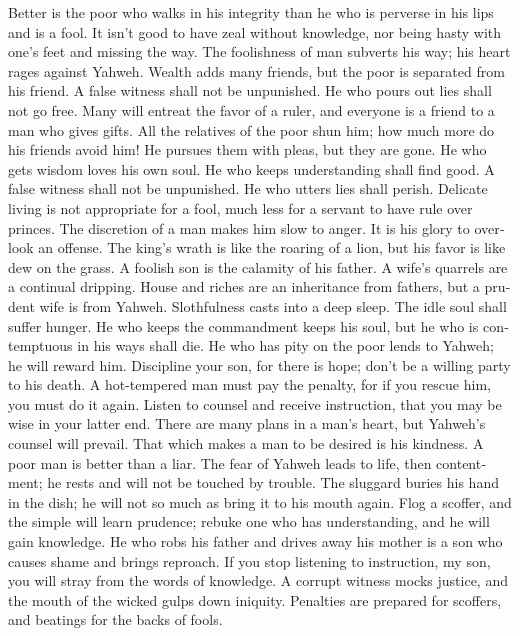 \begin{paracol}{2}
\begin{otherlanguage}{english}
 Better is the poor who walks in his integrity than he who
is perverse in his lips and is a fool.  It isn't good to
have zeal without knowledge, nor being hasty with one's feet and missing
the way.  The foolishness of man subverts his way; his
heart rages against Yahweh.  Wealth adds many friends, but
the poor is separated from his friend.  A false witness
shall not be unpunished. He who pours out lies shall not go free.
 Many will entreat the favor of a ruler, and everyone is a
friend to a man who gives gifts.  All the relatives of the
poor shun him; how much more do his friends avoid him! He pursues them
with pleas, but they are gone.  He who gets wisdom loves
his own soul. He who keeps understanding shall find good. 
A false witness shall not be unpunished. He who utters lies shall
perish.  Delicate living is not appropriate for a fool,
much less for a servant to have rule over princes.  The
discretion of a man makes him slow to anger. It is his glory to overlook
an offense.  The king's wrath is like the roaring of a
lion, but his favor is like dew on the grass.  A foolish
son is the calamity of his father. A wife's quarrels are a continual
dripping.  House and riches are an inheritance from
fathers, but a prudent wife is from Yahweh.  Slothfulness
casts into a deep sleep. The idle soul shall suffer hunger.
 He who keeps the commandment keeps his soul, but he who
is contemptuous in his ways shall die.  He who has pity
on the poor lends to Yahweh; he will reward him. 
Discipline your son, for there is hope; don't be a willing party to his
death.  A hot-tempered man must pay the penalty, for if
you rescue him, you must do it again.  Listen to counsel
and receive instruction, that you may be wise in your latter end.
 There are many plans in a man's heart, but Yahweh's
counsel will prevail.  That which makes a man to be
desired is his kindness. A poor man is better than a liar.
 The fear of Yahweh leads to life, then contentment; he
rests and will not be touched by trouble.  The sluggard
buries his hand in the dish; he will not so much as bring it to his
mouth again.  Flog a scoffer, and the simple will learn
prudence; rebuke one who has understanding, and he will gain knowledge.
 He who robs his father and drives away his mother is a
son who causes shame and brings reproach.  If you stop
listening to instruction, my son, you will stray from the words of
knowledge.  A corrupt witness mocks justice, and the
mouth of the wicked gulps down iniquity.  Penalties are
prepared for scoffers, and beatings for the backs of fools.


\end{otherlanguage}
\end{paracol}
